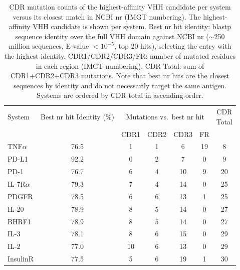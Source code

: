 \documentclass[11pt]{article}
\begin{document}
\begin{table}[!htbp]
\centering
\begin{tabular}{lc*{5}{c}}
\toprule
System & Best nr hit Identity (\%) & \multicolumn{4}{c}{Mutations vs.\ best nr hit} & \shortstack[c]{CDR\\Total}\\
\cmidrule(lr){3-6}
 & & CDR1 & CDR2 & CDR3 & FR & \\
\midrule
TNF$\alpha$    & 76.5 & 1  & 1 & 6  & 19 & 8\\
PD-L1       & 92.2 & 0  & 2 & 7  & 0  & 9\\
PD-1        & 76.7 & 6  & 4 & 10 & 9  & 20\\
IL-7R$\alpha$  & 79.3 & 7  & 4 & 14 & 0  & 25\\
PDGFR       & 78.5 & 6  & 6 & 13 & 1  & 25\\
IL-20       & 78.9 & 8  & 5 & 14 & 0  & 27\\
BHRF1       & 78.9 & 8  & 5 & 14 & 0  & 27\\
IL-3        & 78.1 & 8  & 6 & 15 & 0  & 29\\
IL-2        & 77.0 & 10 & 6 & 13 & 0  & 29\\
InsulinR    & 77.5 & 5  & 6 & 19 & 1  & 30\\
\bottomrule
\end{tabular}
\caption{CDR mutation counts of the highest-affinity VHH candidate per system versus its closest
match in NCBI nr (IMGT numbering). The highest-affinity VHH candidate is shown per system. Best nr hit identity: blastp sequence identity over the full VHH
domain against NCBI nr ($\sim$250 million sequences, E-value $< 10^{-5}$, top 20 hits), selecting the entry with the highest
identity. CDR1/CDR2/CDR3/FR: number of mutated residues in each region (IMGT numbering). CDR Total: sum of
CDR1+CDR2+CDR3 mutations. Note that best nr hits are the closest sequences by identity and do not necessarily target
the same antigen. Systems are ordered by CDR total in ascending order.}
\label{tab:cdr_nr}
\end{table}
\end{document}
